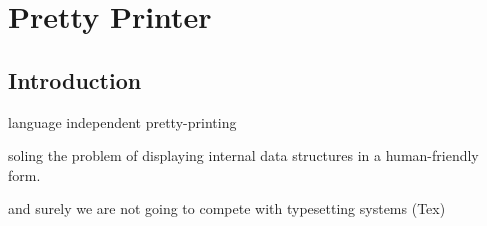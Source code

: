 \chapter{Pretty Printer}


\section{Introduction}

language independent pretty-printing

soling the problem of displaying internal data structures in a human-friendly form.

and surely we are not going to compete with typesetting systems (Tex)

